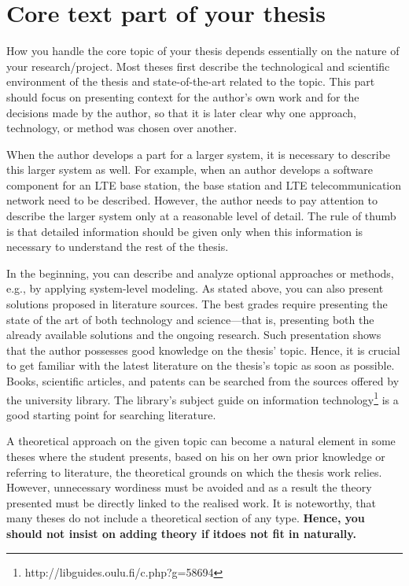 \section{Core text part of your thesis}

How you handle the core topic of your thesis depends essentially on the nature of your research/project. Most theses first describe the technological and scientific environment of the thesis and state-of-the-art related to the topic. This part should focus on presenting context for the author’s own work and for the decisions made by the author, so that it is later clear why one approach, technology, or method was chosen over another.

When the author develops a part for a larger system, it is necessary to describe this larger system as well. For example, when an author develops a software component for an LTE base station, the base station and LTE telecommunication network need to be described. However, the author needs to pay attention to describe the larger system only at a reasonable level of detail. The rule of thumb is that detailed information should be given only when this information is necessary to understand the rest of the thesis.

In the beginning, you can describe and analyze optional approaches or methods, e.g., by applying system-level modeling. As stated above, you can also present solutions proposed in literature sources. The best grades require presenting the state of the art of both technology and science---that is, presenting both the already available solutions and the ongoing research. Such presentation shows that the author possesses good knowledge on the thesis’ topic. Hence, it is crucial to get familiar with the latest literature on the thesis’s topic as soon as possible. Books, scientific articles, and patents can be searched from the sources offered by the university library. The library’s subject guide on information technology\footnote{ http://libguides.oulu.fi/c.php?g=58694} is a good starting point for searching literature.

A theoretical approach on the given topic can become a natural element in some theses where the student presents, based on his on her own prior knowledge or referring to literature, the theoretical grounds on which the
thesis work relies. However, unnecessary wordiness must be avoided and as a result the theory presented must be directly linked to the realised work. It is noteworthy, that many theses do not include a theoretical section of any type. \textbf{Hence, you should not insist on adding theory if itdoes not fit in naturally.}

